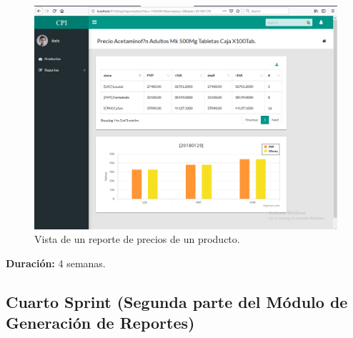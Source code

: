 \begin{figure}[H]
  \begin{center}
  \includegraphics[width=\textwidth]{reporte_barras.png}
  \caption{Vista de un reporte de precios de un producto.}
  \label{fig:barras}
  \end{center}
  \end{figure}

\textbf{Duración:} 4 semanas.

\subsection{Cuarto Sprint (Segunda parte del Módulo de Generación de Reportes)}

